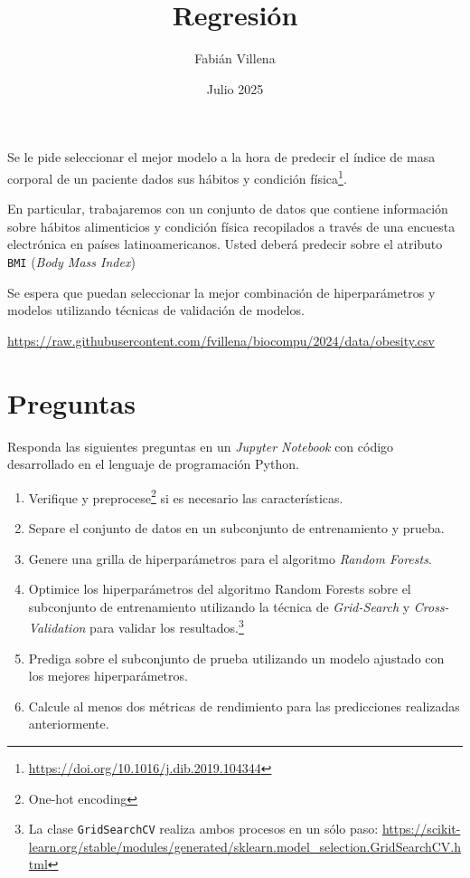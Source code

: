 \documentclass{article}
\title{Regresión}
\author{Fabián Villena}
\date{Julio 2025}
\begin{document}
\maketitle

Se le pide seleccionar el mejor modelo a la hora de predecir el índice de masa corporal de un paciente dados sus hábitos y condición física\footnote{\url{https://doi.org/10.1016/j.dib.2019.104344}}.

En particular, trabajaremos con un conjunto de datos que contiene información sobre hábitos alimenticios y condición física recopilados a través de una encuesta electrónica en países latinoamericanos. Usted deberá predecir sobre el atributo \texttt{BMI} (\textit{Body Mass Index})

Se espera que puedan seleccionar la mejor combinación de hiperparámetros y modelos utilizando técnicas de validación de modelos. 

\begin{center}
    \url{https://raw.githubusercontent.com/fvillena/biocompu/2024/data/obesity.csv}
\end{center}

\section*{Preguntas}

Responda las siguientes preguntas en un \textit{Jupyter Notebook} con código desarrollado en el lenguaje de programación Python.

\begin{enumerate}
    \item Verifique y preprocese\footnote{One-hot encoding} si es necesario las características.
    \item Separe el conjunto de datos en un subconjunto de entrenamiento y prueba.
    \item Genere una grilla de hiperparámetros para el algoritmo \textit{Random Forests}.
    \item Optimice los hiperparámetros del algoritmo Random Forests sobre el subconjunto de entrenamiento utilizando la técnica de \textit{Grid-Search} y \textit{Cross-Validation} para validar los resultados.\footnote{La clase \texttt{GridSearchCV} realiza ambos procesos en un sólo paso: \url{https://scikit-learn.org/stable/modules/generated/sklearn.model_selection.GridSearchCV.html}}
    \item Prediga sobre el subconjunto de prueba utilizando un modelo ajustado con los mejores hiperparámetros.
    \item Calcule al menos dos métricas de rendimiento para las predicciones realizadas anteriormente.
\end{enumerate}
\end{document}
